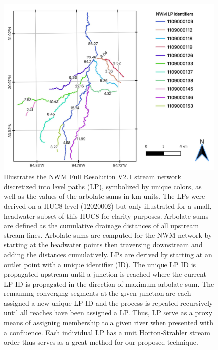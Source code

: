 \documentclass[draft]{dependencies/agujournal2019}
\begin{document}
\begin{figure}[H]
\centering
\includegraphics[scale=1.0]{figures/level_path_methods.jpg}
\caption{Illustrates the NWM Full Resolution V2.1 stream network discretized into level paths (LP), symbolized by unique colors, as well as the values of the arbolate sums in km units.
The LPs were derived on a HUC8 level (12020002) but only illustrated for a small, headwater subset of this HUC8 for clarity purposes.
Arbolate sums are defined as the cumulative drainage distances of all upstream stream lines.
Arbolate sums are computed for the NWM network by starting at the headwater points then traversing downstream and adding the distances cumulatively. 
LPs are derived by starting at an outlet point with a unique identifier (ID).
The unique LP ID is propagated upstream until a junction is reached where the current LP ID is propagated in the direction of maximum arbolate sum.
The remaining converging segments at the given junction are each assigned a new unique LP ID and the process is repeated recursively until all reaches have been assigned a LP.
Thus, LP serve as a proxy means of assigning membership to a given river when presented with a confluence.
Each individual LP has a unit Horton-Strahler stream order thus serves as a great method for our proposed technique.
}
\label{fig:level_path_methods}
\end{figure}
%
%
\end{document}
